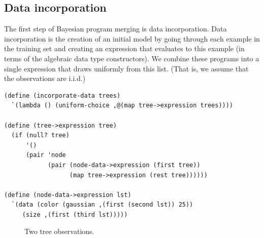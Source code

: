 \documentclass[a4paper,10pt]{article}
\begin{document}
\subsection{Data incorporation}
The first step of Bayesian program merging is data incorporation.  Data incorporation is the creation of an initial model by going through each example in the training set and creating an expression that evaluates to this example (in terms of the algebraic data type constructors).  We combine these programs into a single expression that draws uniformly from this list. (That is, we assume that the observations are i.i.d.) 
\begin{lstlisting}[frame=trblsingle]
(define (incorporate-data trees)
  `(lambda () (uniform-choice ,@(map tree->expression trees))))

(define (tree->expression tree)
  (if (null? tree)
      '()
      (pair 'node
            (pair (node-data->expression (first tree)) 
                  (map tree->expression (rest tree))))))

(define (node-data->expression lst)
  `(data (color (gaussian ,(first (second lst)) 25)) 
	 (size ,(first (third lst)))))
\end{lstlisting}

\begin{figure}[t]
  \subfloat{}
  \hspace{40pt} %
\caption{Two tree observations.}
\label{fig:tree-obs}
\end{figure}
\end{document}
